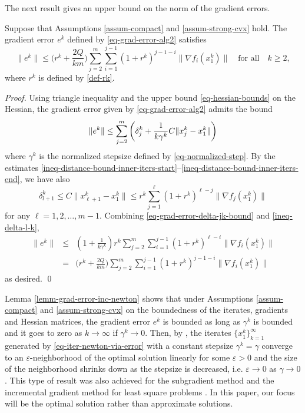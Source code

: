 \documentclass[final,numbook]{svjour3}
\begin{document}
The next result gives an upper bound on the norm of the gradient errors. 
\begin{lemma}\label{lemm-grad-error-inc-newton} Suppose that Assumptions \ref{assum-compact} and \ref{assum-strong-cvx} hold. The gradient error $e^k$ defined by \eqref{eq-grad-error-alg2} satisfies
 \begin{equation}\label{ineq-grad-error-bound-with-gradients} \| e^k \| \leq \bigg( r^k + \frac{2Q}{km}\bigg) \sum_{j=2}^m  \sum_{i=1}^{j-1} (1 + r^k)^{j-1 - i} \| \nabla f_i (x_1^k)\| \quad \mbox{for all} \quad k\geq 2,
 \end{equation}
where $r^k$ is defined by \eqref{def-rk}.
\end{lemma}
\begin{proof} Using triangle inequality and the upper bound \eqref{eq-hessian-bounds} on the Hessian, the gradient error given by \eqref{eq-grad-error-alg2} admits the bound
\begin{equation}\label{eq-grad-error-delta-jk-bound}
	\| e^k \|  \leq \sum_{j=2}^m \bigg( \delta_j^k + \frac{1}{k \gamma^k} {C} \| x_j^k - x_1^k\| \bigg) \\
\end{equation}
where $\gamma^k$ is the normalized stepsize defined by \eqref{eq-normalized-step}. By the estimates \eqref{ineq-distance-bound-inner-iters-start}--\eqref{ineq-distance-bound-inner-iters-end}, we have also
  \begin{equation}\label{ineq-delta-l-k} \delta_{l+1}^k \leq {C} \| x_{\ell+1}^k - x_1^k \| \leq r^k \sum_{j=1}^\ell (1 + r^k)^{\ell - j} \| \nabla f_j (x_1^k)\| 
  \end{equation}
for any $\ell=1,2,\dots,m-1$. Combining \eqref{eq-grad-error-delta-jk-bound} and \eqref{ineq-delta-l-k},
\begin{eqnarray*}
 \| e^k \| &\leq &(1 + \frac{1}{k\gamma^k} )r^k \sum_{j=2}^m  \sum_{i=1}^{j-1} (1 + r^k)^{\ell - i} \| \nabla f_i (x_1^k)\| \\
 &=& \bigg( r^k + \frac{2Q}{km}\bigg) \sum_{j=2}^m  \sum_{i=1}^{j-1} (1 + r^k)^{j -1 - i} \| \nabla f_i (x_1^k)\|
\end{eqnarray*}
as desired.   
\qed
\end{proof}

Lemma \ref{lemm-grad-error-inc-newton} shows that under Assumptions \ref{assum-compact} and \ref{assum-strong-cvx} on the boundedness of the iterates, gradients and Hessian matrices, the gradient error $e^k$ is bounded as long as $\gamma^k$ is bounded and it goes to zero as $k\to \infty$ if $\gamma^k\to 0$. Then, by \cite[Theorem 1, Section 4.2.2]{Pol87}, the iterates $\{x_1^k\}_{k=1}^\infty$ generated by \eqref{eq-iter-newton-via-error}
with a constant stepsize $\gamma^k = \gamma$ converge to an $\varepsilon$-neighborhood of the optimal solution linearly for some $\varepsilon>0$ and the size of the neighborhood shrinks down as the stepsize is decreased, i.e. $\varepsilon \to 0$ as $\gamma \to 0$. This type of result was also achieved for the subgradient method \cite{NedicBert2001IncSubgrad} and the incremental gradient method for least square problems \cite[Section 1.5.2]{Bertsekas99nonlinear}. In this paper, our focus will be the optimal solution rather than approximate solutions. 
\end{document}
